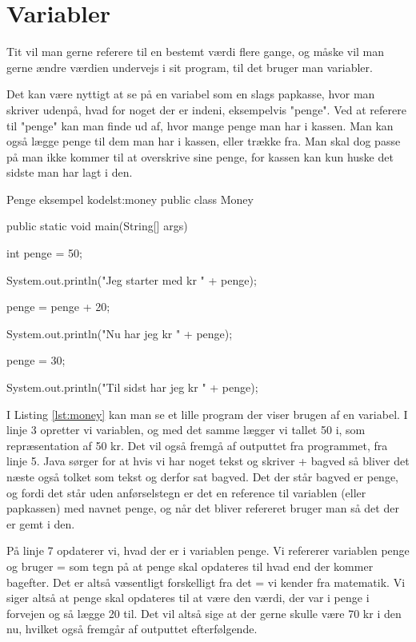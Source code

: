 \section{Variabler}
Tit vil man gerne referere til en bestemt værdi flere gange, og måske vil man gerne ændre værdien undervejs i sit program, til det bruger man variabler. 

Det kan være nyttigt at se på en variabel som en slags papkasse, hvor man skriver udenpå, hvad for noget der er indeni, eksempelvis "penge". Ved at referere til "penge" kan man finde ud af, hvor mange penge man har i kassen. Man kan også lægge penge til dem man har i kassen, eller trække fra. Man skal dog passe på man ikke kommer til at overskrive sine penge, for kassen kan kun huske det sidste man har lagt i den.

\begin{JavaCode}{Penge eksempel kode}{lst:money}
public class Money {
	public static void main(String[] args) {
		int penge = 50;
		
		System.out.println("Jeg starter med kr " + penge);
		
		penge = penge + 20;
		
		System.out.println("Nu har jeg kr " + penge);
		
		penge = 30;

		System.out.println("Til sidst har jeg kr " + penge);
	}
}
\end{JavaCode}

I Listing \ref{lst:money} kan man se et lille program der viser brugen af en variabel. I linje 3 opretter vi variablen, og med det samme lægger vi tallet 50 i, som repræsentation af 50 kr. Det vil også fremgå af outputtet fra programmet, fra linje 5. Java sørger for at hvis vi har noget tekst og skriver + bagved så bliver det næste også tolket som tekst og derfor sat bagved. Det der står bagved er penge, og fordi det står uden anførselstegn er det en reference til variablen (eller papkassen) med navnet penge, og når det bliver refereret bruger man så det der er gemt i den.

På linje 7 opdaterer vi, hvad der er i variablen penge. Vi refererer variablen penge og bruger = som tegn på at penge skal opdateres til hvad end der kommer bagefter. Det er altså væsentligt forskelligt fra det = vi kender fra matematik. Vi siger altså at penge skal opdateres til at være den værdi, der var i penge i forvejen og så lægge 20 til. Det vil altså sige at der gerne skulle være 70 kr i den nu, hvilket også fremgår af outputtet efterfølgende.

